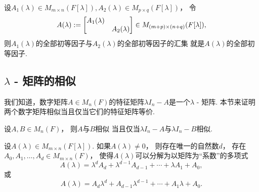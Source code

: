 \begin{theorem}
设\(
	A_1(\lambda) \in M_{m \times n}(F[\lambda]),
	A_2(\lambda) \in M_{p \times q}(F[\lambda])
\)，
令\begin{equation*}
	A(\lambda)
	:=
	\begin{bmatrix}
		A_1(\lambda) \\
		& A_2(\lambda)
	\end{bmatrix}
	\in M_{(m+p) \times (n+q)}(F[\lambda]),
\end{equation*}
则\(A_1(\lambda)\)的全部初等因子与\(A_2(\lambda)\)的全部初等因子的汇集
就是\(A(\lambda)\)的全部初等因子.
\end{theorem}


\subsection{\texorpdfstring{$\lambda$}{\textlambda} - 矩阵的相似}
我们知道，数字矩阵\(A \in M_n(F)\)的特征矩阵\(\lambda I_n - A\)是一个\(\lambda\) - 矩阵.
本节来证明两个数字矩阵相似当且仅当它们的特征矩阵等价.

\begin{lemma}
设\(A,B \in M_n(F)\)，
则\(A\)与\(B\)相似
当且仅当\(\lambda I_n - A\)与\(\lambda I_n - B\)相似.
\end{lemma}

\begin{lemma}
设\(A(\lambda) \in M_{m \times n}(F[\lambda])\).
如果\(A(\lambda) \neq 0\)，
则存在唯一的自然数\(d\)，
存在\(A_0,A_1,\dotsc,\allowbreak A_d \in M_{m \times n}(F)\)，
使得\(A(\lambda)\)可以分解为以矩阵为“系数”的多项式\begin{equation}
	A(\lambda)
	= \lambda^d A_d
	+ \lambda^{d-1} A_{d-1}
	+ \dotsb
	+ \lambda A_1
	+ A_0,
\end{equation}
或\begin{equation}
	A(\lambda)
	= A_d \lambda^d
	+ A_{d-1} \lambda^{d-1}
	+ \dotsb
	+ A_1 \lambda
	+ A_0.
\end{equation}
\end{lemma}

